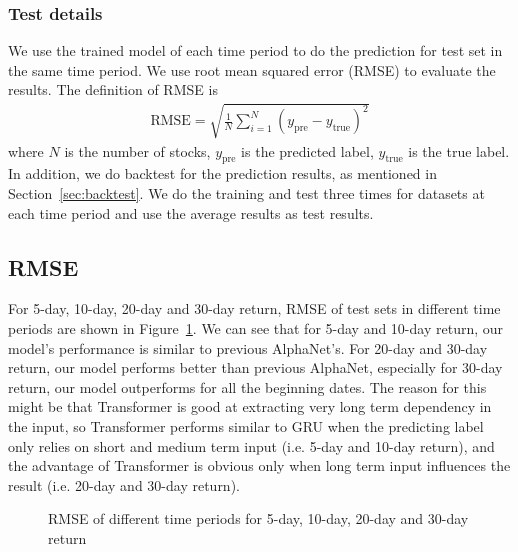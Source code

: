 \documentclass{article}
\begin{document}
\subsubsection{Test details}
\hspace{16}We use the trained model of each time period to do the prediction for test set in the same time period. We use root mean squared error (RMSE) to evaluate the results. The definition of RMSE is
\begin{equation*}
    \begin{aligned}
    \textrm{RMSE} = \sqrt{\frac{1}{N}\sum_{i=1}^N(y_{\textrm{pre}} -y_{\textrm{true}})^2}
    \end{aligned}
\end{equation*}
where $N$ is the number of stocks, $y_{\textrm{pre}}$ is the predicted label, $y_{\textrm{true}}$ is the true label. In addition, we do backtest for the prediction results, as mentioned in Section~\ref{sec:backtest}. We do the training and test three times for datasets at each time period and use the average results as test results.

\subsection{RMSE}
\hspace{16}For 5-day, 10-day, 20-day and 30-day return, RMSE of test sets in different time periods are shown in Figure~\ref{fig:RMSE}. We can see that for 5-day and 10-day return, our model's performance is similar to previous AlphaNet's. For 20-day and 30-day return, our model performs better than previous AlphaNet, especially for 30-day return, our model outperforms for all the beginning dates. The reason for this might be that Transformer is good at extracting very long term dependency in the input, so Transformer performs similar to GRU when the predicting label only relies on short and medium term input (i.e. 5-day and 10-day return), and the advantage of Transformer is obvious only when long term input influences the result (i.e. 20-day and 30-day return).


\begin{figure}[htbp]
    \caption{RMSE of different time periods for 5-day, 10-day, 20-day and 30-day return}
    \label{fig:RMSE}
\end{figure}
\end{document}
